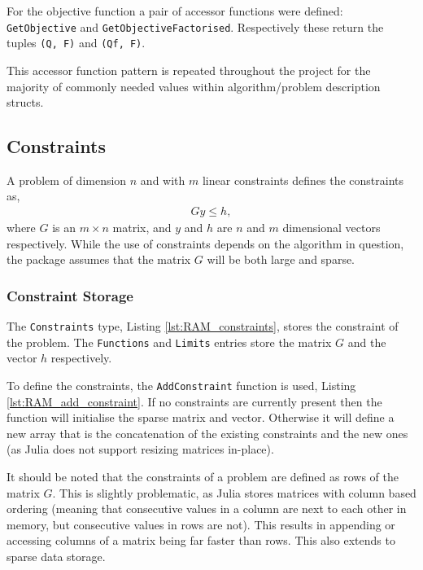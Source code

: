 For the objective function a pair of accessor functions were defined: \texttt{GetObjective} and \texttt{GetObjectiveFactorised}. Respectively these return the tuples \texttt{(Q, F)} and \texttt{(Qf, F)}.

This accessor function pattern is repeated throughout the project for the majority of commonly needed values within algorithm/problem description structs.

\subsection{Constraints}\label{sub:constraints_ram}

A problem of dimension $n$ and with $m$ linear constraints defines the constraints as,
\begin{gather}
    Gy\leq h,
\end{gather}
where $G$ is an $m\times n$ matrix, and $y$ and $h$ are $n$ and $m$ dimensional vectors respectively. While the use of constraints depends on the algorithm in question, the package assumes that the matrix $G$ will be both large and sparse. 

\subsubsection{Constraint Storage}

The \texttt{Constraints} type, Listing \ref{lst:RAM_constraints}, stores the constraint of the problem. The \texttt{Functions} and \texttt{Limits} entries store the matrix $G$ and the vector $h$ respectively. 



To define the constraints, the \texttt{AddConstraint} function is used, Listing \ref{lst:RAM_add_constraint}. If no constraints are currently present then the function will initialise the sparse matrix and vector. Otherwise it will define a new array that is the concatenation of the existing constraints and the new ones (as Julia does not support resizing matrices in-place). 



It should be noted that the constraints of a problem are defined as rows of the matrix $G$. This is slightly problematic, as Julia stores matrices with column based ordering (meaning that consecutive values in a column are next to each other in memory, but consecutive values in rows are not). This results in appending or accessing columns of a matrix being far faster than rows. This also extends to sparse data storage.

